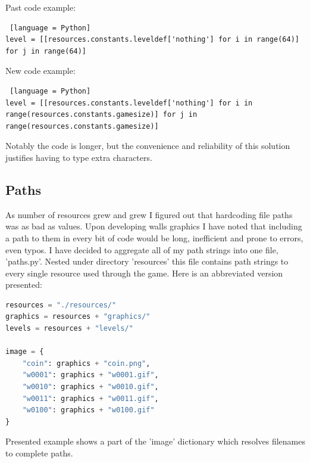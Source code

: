 \documentclass[11pt,a4paper,notitlepage]{report}
\newcommand{\dsubsection}[1]{\FloatBarrier \subsection{#1}}
\begin{document}
				Past code example:
				\begin{lstlisting} [language = Python]
level = [[resources.constants.leveldef['nothing'] for i in range(64)] for j in range(64)]
				\end{lstlisting}
				New code example:
				\begin{lstlisting} [language = Python]
level = [[resources.constants.leveldef['nothing'] for i in range(resources.constants.gamesize)] for j in range(resources.constants.gamesize)]
				\end{lstlisting}
				Notably the code is longer, but the convenience and reliability of this solution justifies having to type extra characters.
			\dsubsection{Paths}
				As number of resources grew and grew I figured out that hardcoding file paths was as bad as values. Upon developing walls graphics I have noted that including a path to them in every bit of code would be long, inefficient and prone to errors, even typos.
				I have decided to aggregate all of my path strings into one file, 'paths.py'. Nested under directory 'resources' this file contains path strings to every single resource used through the game.
				Here is an abbreviated version presented:
				\begin{lstlisting}[language=Python]
resources = "./resources/"
graphics = resources + "graphics/"
levels = resources + "levels/"

image = {
	"coin": graphics + "coin.png",
	"w0001": graphics + "w0001.gif",
	"w0010": graphics + "w0010.gif",
	"w0011": graphics + "w0011.gif",
	"w0100": graphics + "w0100.gif"
}
				\end{lstlisting}
				Presented example shows a part of the 'image' dictionary which resolves filenames to complete paths.
\end{document}
